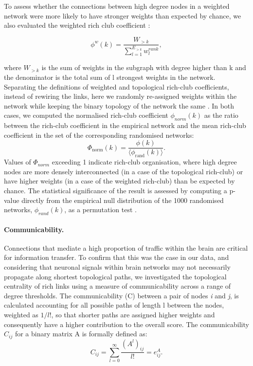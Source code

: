 To assess whether the connections between high degree nodes in a weighted network were more likely to have stronger weights than expected by chance, we also evaluated the weighted rich club coefficient \citep{Opsahl2008}: 

\begin{equation}
    \label{eqn:Ch5Eq2}
    \phi^{w}(k) = \frac{W_{>k}}{\sum_{l=1}^{E_{>k}}w^{rank}_{l}},
\end{equation}

where $W_{>k}$ is the sum of weights in the subgraph with degree higher than k and the denominator is the total sum of l strongest weights in the network. Separating the definitions of weighted and topological rich-club coefficients, instead of rewiring the links, here we randomly re-assigned weights within the network while keeping the binary topology of the network the same \citep{Alstott2014}. In both cases, we computed the normalised rich-club coefficient $\phi_{norm}(k)$ as the ratio between the rich-club coefficient in the empirical network and the mean rich-club coefficient in the set of the corresponding randomised networks:
\begin{equation}
    \label{eqn:Ch5Eq3}
    \Phi_\mathrm{norm}(k) = \frac{\phi(k)}{\langle \phi_\mathrm{rand}(k) \rangle}.
\end{equation} 
Values of $\Phi_{norm}$ exceeding 1 indicate rich-club organisation, where high degree nodes are more densely interconnected (in a case of the topological rich-club) or have higher weights (in a case of the weighted rich-club) than be expected by chance. The statistical significance of the result is assessed by computing a p-value directly from the empirical null distribution of the 1000 randomised networks, $\phi_{rand}(k)$, as a permutation test \citep{VandenHeuvel2011}. 

\paragraph*{Communicability.}

Connections that mediate a high proportion of traffic within the brain are critical for information transfer. To confirm that this was the case in our data, and considering that neuronal signals within brain networks may not necessarily propagate along shortest topological paths, we investigated the topological centrality of rich links using a measure of communicability \citep{Estrada2008} across a range of degree thresholds. The communicability (C) between a pair of nodes \textit{i} and \textit{j}, is calculated accounting for all possible paths of length l between the nodes, weighted as $1/l!$, so that shorter paths are assigned higher weights and consequently have a higher contribution to the overall score. The communicability $C_{ij}$ for a binary matrix A is formally defined as: 
\begin{equation}
    \label{eqn:Ch5Eq4}
    C_{ij}= \sum_{l=0}^{\infty}\frac{(A^{l})_{ij}}{l!} = e^{A}_{ij}.
\end{equation} 


